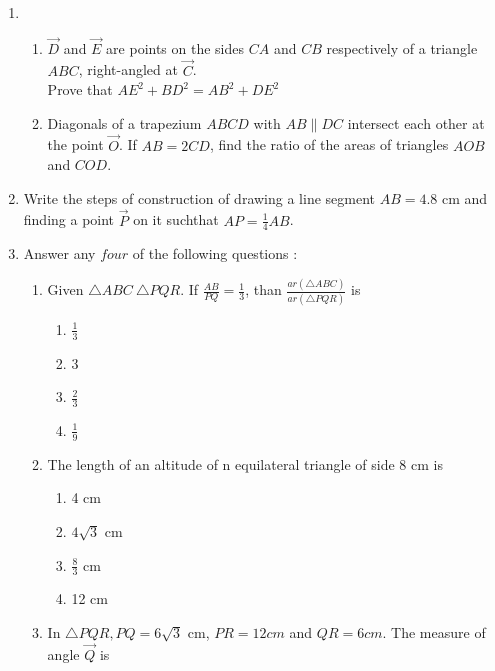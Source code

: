 %
\begin{enumerate}[label=\thesection.\arabic*.,ref=\thesection.\theenumi]
\item
		\begin{enumerate}
			\item $ \vec{D} $ and $ \vec{E} $ are points on the sides $ CA $ and $ CB $ respectively 
				of a triangle $ ABC $, right-angled at $ \vec{C} $. \\
		        Prove that $ AE^2 + BD^2 =AB^2 + DE^2 $ 

			\item Diagonals of a trapezium $ ABCD $ with $ AB \parallel DC $ intersect each other at 
				the point $ \vec{O} $. If $ AB =2 CD $, find the ratio of the areas of triangles 
				$ AOB $ and $ COD $. 
		\end{enumerate}
	\item Write the steps of construction of drawing a line segment $ AB = 4.8 $ cm and finding a point 
		$ \vec{P} $ on it suchthat $ AP = \frac{1}{4} AB $. 
	\item Answer any $ four $ of the following questions : 
		\begin{enumerate}
		\item Given $ \triangle ABC ~ \triangle PQR $. If $ \frac{AB}{PQ} = \frac{1}{3} $, than 
			$ \frac{ar(\triangle ABC)}{ar(\triangle PQR)} $ is
			\begin{enumerate}
			\item $ \frac{1}{3} $
			\item 3
			\item $ \frac{2}{3} $
			\item $ \frac{1}{9} $
			\end{enumerate}
		\item The length of an altitude of n equilateral triangle of side 8 cm is
			\begin{enumerate}
				\item 4 cm
				\item $ 4\sqrt{3} $ cm
				\item $ \frac{8}{3} $ cm
				\item 12 cm
			\end{enumerate}
		\item In $ \triangle PQR, PQ = 6 \sqrt{3} $ cm, $ PR = 12 cm $ and $ QR = 6 cm $. The measure of 
			angle $ \vec{Q} $ is
			\begin{enumerate}

\end{enumerate}
\end{enumerate}
\end{enumerate}

